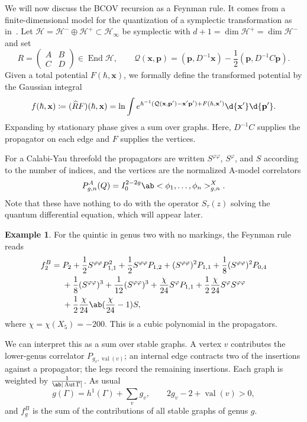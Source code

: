 \documentclass{amsart}
\theoremstyle{definition}
\newtheorem{exm}[thm]{Example}
\theoremstyle{remark}
\theoremstyle{plain}
\theoremstyle{definition}
\theoremstyle{remark}
\newcommand{\mc}[1]{\mathcal{#1}}
\newcommand{\mbf}[1]{\mathbf{#1}}
\newcommand{\bp}{\mbf{p}}
\newcommand{\on}[1]{\operatorname{#1}}
\newcommand{\wh}[1]{\widehat{#1}}
\newcommand{\1}{\mathbf{1}}
\newcommand{\2}{\mathbf{2}}
\newcommand{\3}{\mathbf{3}}
\DeclareMathOperator{\End}{End}
\DeclareMathOperator{\Aut}{Aut}
\begin{document}
We will now discuss the BCOV recursion as a Feynman rule. It comes from a finite-dimensional model for the quantization of a symplectic transformation as in~. Let \(\mc{H} = \mc{H}^- \oplus \mc{H}^+ \subset \mc{H}_{\infty}\) be symplectic with \(d+1 = \dim \mc{H}^+ = \dim \mc{H}^-\) and set
\[ R = \begin{pmatrix} A & B \\ C & D \end{pmatrix} \in \End \mc{H}, \qquad \mc{Q}(\mbf{x},\bp) = (\bp, D^{-1}\mbf{x}) - \frac{1}{2}(\bp, D^{-1}C\bp). \]
Given a total potential \(F(\hbar, \mbf{x})\), we formally define the transformed potential by the Gaussian integral
\[ f(\hbar, \mbf{x}) \coloneqq (\wh{R}F)(\hbar,\mbf{x}) = \ln \int e^{\hbar^{-1}(\mc{Q}(\mbf{x},\bp') - \mbf{x}'\bp') + F(\hbar,\mbf{x}')}\d{\mbf{x}'}\d{\bp'}. \]
Expanding by stationary phase gives a sum over graphs. Here, \(D^{-1}C\) supplies the propagator on each edge and \(F\) supplies the vertices.

For a Calabi-Yau threefold the propagators are written \(S^{\varphi\varphi}\), \(S^{\varphi}\), and \(S\) according to the number of indices, and the vertices are the normalized A-model correlators
\[ P^A_{g,n}(Q) = I_0^{2-2g}\ab<\phi_1, \ldots, \phi_n>^X_{g,n}. \]
Note that these have nothing to do with the operator \(S_{\tau}(z)\) solving the quantum differential equation, which will appear later.

\begin{exm}
    For the quintic in genus two with no markings, the Feynman rule reads
    \begin{align*}
        f_2^B ={}& P_2 + \frac{1}{2}S^{\varphi\varphi}P_{1,1}^2 + \frac{1}{2}S^{\varphi\varphi}P_{1,2} + (S^{\varphi\varphi})^2 P_{1,1} + \frac{1}{8}(S^{\varphi\varphi})^2 P_{0,4} \\
        &+ \frac{1}{8}(S^{\varphi\varphi})^3 + \frac{1}{12}(S^{\varphi\varphi})^3 + \frac{\chi}{24}S^{\varphi}P_{1,1} + \frac{1}{2}\frac{\chi}{24}S^{\varphi}S^{\varphi\varphi} \\
        &+ \frac{1}{2}\frac{\chi}{24}\ab(\frac{\chi}{24}-1)S,
    \end{align*}
    where \(\chi = \chi(X_5) = -200\). This is a cubic polynomial in the propagators.
\end{exm}

We can interpret this as a sum over stable graphs. A vertex \(v\) contributes the lower-genus correlator \(P_{g_v, \on{val}(v)}\); an internal edge contracts two of the insertions against a propagator; the legs record the remaining insertions. Each graph is weighted by \(\frac{1}{\ab|\Aut \Gamma|}\). As usual
\[ g(\Gamma) = h^1(\Gamma) + \sum_v g_v, \qquad 2g_v - 2 + \on{val}(v) > 0, \]
and \(f_g^B\) is the sum of the contributions of all stable graphs of genus \(g\).
\end{document}
